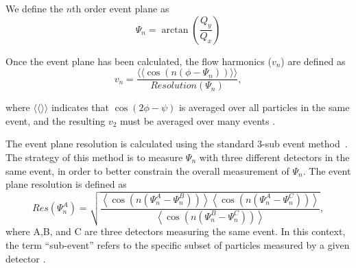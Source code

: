 We define the $n$th order event plane as
$$\Psi_n = \arctan \left( \frac{Q_y}{Q_x} \right) $$

Once the event plane has been calculated, the flow harmonics ($v_n$) are defined as
\begin{equation}
v_n = \frac{\langle \langle\cos(n(\phi - \Psi_n))\rangle \rangle}{Resolution(\Psi_n)},
\end{equation}

where $\langle \langle \rangle \rangle$ indicates that $\cos(2\phi-\psi)$ is averaged over all particles in the same event, and the resulting $v_2$ must be averaged over many events \cite{PhysRevC.58.1671}. 

The event plane resolution is calculated using the standard 3-sub event method~\cite{PhysRevC.58.1671}. The strategy of this method is to measure $\Psi_n$ with three
different detectors in the same event, in order to better constrain the overall measurement of $\Psi_n$. The event plane resolution is defined as
\begin{equation}
Res(\Psi_n^A) = \sqrt{\frac{\left<\cos(n(\Psi_n^A - \Psi_n^B))\right>\left<\cos(n(\Psi_n^A - \Psi_n^C))\right>}{\left<\cos(n(\Psi_n^B - \Psi_n^C))\right>}},
\label{eqn:res}
\end{equation}
where A,B, and C are three detectors measuring the same event. In this context, the term ``sub-event'' refers to the specific subset of particles measured by a given detector \cite{PhysRevC.58.1671}.




